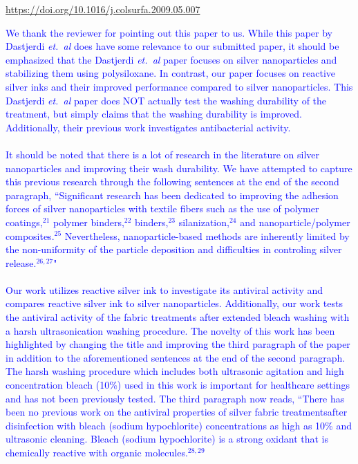 \documentclass[12pt]{letter}
\newcommand{\blue}[1]{\textcolor{blue}{#1}} %
\begin{document}
\url{https://doi.org/10.1016/j.colsurfa.2009.05.007}

\blue{We thank the reviewer for pointing out this paper to us.  While this paper by Dastjerdi \textit{et.~al} does have some relevance to our submitted paper, it should be emphasized that the Dastjerdi \textit{et.~al} paper focuses on silver nanoparticles and stabilizing them using polysiloxane.  In contrast, our paper focuses on reactive silver inks and their improved performance compared to silver nanoparticles.  
This Dastjerdi \textit{et.~al} paper does NOT actually test the washing durability of the treatment, but simply claims that the washing durability is improved. Additionally, their previous work investigates antibacterial activity.\\ \\
It should be noted that there is a lot of research in the literature on silver nanoparticles and improving their wash durability.  We have attempted to capture this previous research through the following sentences at the end of the second paragraph, ``Significant research has been dedicated to improving the adhesion forces of silver nanoparticles with textile fibers such as the use of polymer coatings,$^{21}$ polymer binders,$^{22}$ binders,$^{23}$ silanization,$^{24}$ and nanoparticle/polymer composites.$^{25}$ Nevertheless,  nanoparticle-based methods are inherently limited by the non-uniformity of the particle deposition and difficulties in controling silver release.$^{26,27}$"\\ \\
Our work utilizes reactive silver ink to investigate its antiviral activity and compares reactive silver ink to silver nanoparticles. Additionally, our work tests the antiviral activity of the fabric treatments after extended bleach washing with a harsh ultrasonication washing procedure.  
The novelty of this work has been highlighted by changing the title and improving the third paragraph of the paper in addition to the aforementioned sentences at the end of the second paragraph. The harsh washing procedure which includes both ultrasonic agitation and high concentration bleach (10\%) used in this work is important for healthcare settings and has not been previously tested. The third paragraph now reads, 
``There has been no previous work on the antiviral properties of silver fabric treatmentsafter disinfection with bleach (sodium hypochlorite) concentrations as high as 10\% and ultrasonic cleaning.  Bleach (sodium hypochlorite) is a strong oxidant that is chemically reactive with organic molecules.$^{28,29}$ 
}
\end{document}

